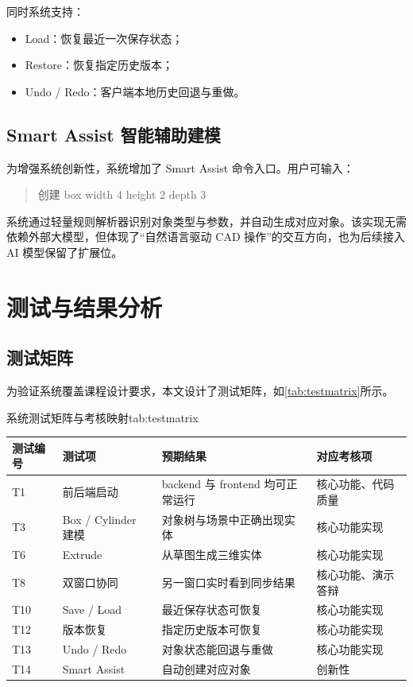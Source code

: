 \documentclass[supercite,macfont]{HustGSClassPaper}
\begin{document}
同时系统支持：

\begin{itemize}[leftmargin=2em]
  \item Load：恢复最近一次保存状态；
  \item Restore：恢复指定历史版本；
  \item Undo / Redo：客户端本地历史回退与重做。
\end{itemize}

\subsection{Smart Assist 智能辅助建模}

为增强系统创新性，系统增加了 Smart Assist 命令入口。用户可输入：

\begin{quote}
创建 box width 4 height 2 depth 3
\end{quote}

系统通过轻量规则解析器识别对象类型与参数，并自动生成对应对象。该实现无需依赖外部大模型，但体现了“自然语言驱动 CAD 操作”的交互方向，也为后续接入 AI 模型保留了扩展位。

\section{测试与结果分析}

\subsection{测试矩阵}

为验证系统覆盖课程设计要求，本文设计了测试矩阵，如\autoref{tab:testmatrix}所示。

\begin{generaltab}{系统测试矩阵与考核映射}{tab:testmatrix}
\begin{tabularx}{\textwidth}{l l X l}
\toprule
测试编号 & 测试项 & 预期结果 & 对应考核项 \\
\midrule
T1 & 前后端启动 & backend 与 frontend 均可正常运行 & 核心功能、代码质量 \\
T3 & Box / Cylinder 建模 & 对象树与场景中正确出现实体 & 核心功能实现 \\
T6 & Extrude & 从草图生成三维实体 & 核心功能实现 \\
T8 & 双窗口协同 & 另一窗口实时看到同步结果 & 核心功能、演示答辩 \\
T10 & Save / Load & 最近保存状态可恢复 & 核心功能实现 \\
T12 & 版本恢复 & 指定历史版本可恢复 & 核心功能实现 \\
T13 & Undo / Redo & 对象状态能回退与重做 & 核心功能实现 \\
T14 & Smart Assist & 自动创建对应对象 & 创新性 \\
\bottomrule
\end{tabularx}
\end{generaltab}
\end{document}
